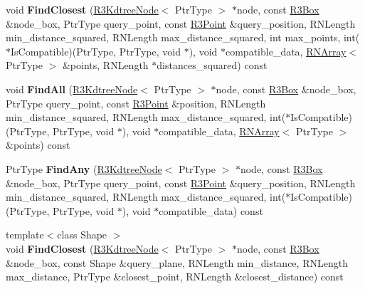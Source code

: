 \begin{DoxyCompactItemize}
\item 
void {\bfseries Find\+Closest} (\hyperlink{class_r3_kdtree_node}{R3\+Kdtree\+Node}$<$ Ptr\+Type $>$ $\ast$node, const \hyperlink{class_r3_box}{R3\+Box} \&node\+\_\+box, Ptr\+Type query\+\_\+point, const \hyperlink{class_r3_point}{R3\+Point} \&query\+\_\+position, R\+N\+Length min\+\_\+distance\+\_\+squared, R\+N\+Length max\+\_\+distance\+\_\+squared, int max\+\_\+points, int($\ast$Is\+Compatible)(Ptr\+Type, Ptr\+Type, void $\ast$), void $\ast$compatible\+\_\+data, \hyperlink{class_r_n_array}{R\+N\+Array}$<$ Ptr\+Type $>$ \&points, R\+N\+Length $\ast$distances\+\_\+squared) const \hypertarget{class_r3_kdtree_ace72061be066f692e4366484a09b6dc9}{}\label{class_r3_kdtree_ace72061be066f692e4366484a09b6dc9}

\item 
void {\bfseries Find\+All} (\hyperlink{class_r3_kdtree_node}{R3\+Kdtree\+Node}$<$ Ptr\+Type $>$ $\ast$node, const \hyperlink{class_r3_box}{R3\+Box} \&node\+\_\+box, Ptr\+Type query\+\_\+point, const \hyperlink{class_r3_point}{R3\+Point} \&position, R\+N\+Length min\+\_\+distance\+\_\+squared, R\+N\+Length max\+\_\+distance\+\_\+squared, int($\ast$Is\+Compatible)(Ptr\+Type, Ptr\+Type, void $\ast$), void $\ast$compatible\+\_\+data, \hyperlink{class_r_n_array}{R\+N\+Array}$<$ Ptr\+Type $>$ \&points) const \hypertarget{class_r3_kdtree_a184a5fe64cb187f2065f819fcc1b36a5}{}\label{class_r3_kdtree_a184a5fe64cb187f2065f819fcc1b36a5}

\item 
Ptr\+Type {\bfseries Find\+Any} (\hyperlink{class_r3_kdtree_node}{R3\+Kdtree\+Node}$<$ Ptr\+Type $>$ $\ast$node, const \hyperlink{class_r3_box}{R3\+Box} \&node\+\_\+box, Ptr\+Type query\+\_\+point, const \hyperlink{class_r3_point}{R3\+Point} \&query\+\_\+position, R\+N\+Length min\+\_\+distance\+\_\+squared, R\+N\+Length max\+\_\+distance\+\_\+squared, int($\ast$Is\+Compatible)(Ptr\+Type, Ptr\+Type, void $\ast$), void $\ast$compatible\+\_\+data) const \hypertarget{class_r3_kdtree_a6c923385fea98e251e9ffd5682e9d5ee}{}\label{class_r3_kdtree_a6c923385fea98e251e9ffd5682e9d5ee}

\item 
{\footnotesize template$<$class Shape $>$ }\\void {\bfseries Find\+Closest} (\hyperlink{class_r3_kdtree_node}{R3\+Kdtree\+Node}$<$ Ptr\+Type $>$ $\ast$node, const \hyperlink{class_r3_box}{R3\+Box} \&node\+\_\+box, const Shape \&query\+\_\+plane, R\+N\+Length min\+\_\+distance, R\+N\+Length max\+\_\+distance, Ptr\+Type \&closest\+\_\+point, R\+N\+Length \&closest\+\_\+distance) const \hypertarget{class_r3_kdtree_abb08d5b25e8f6f37d07de1045b445690}{}\label{class_r3_kdtree_abb08d5b25e8f6f37d07de1045b445690}


\end{DoxyCompactItemize}
